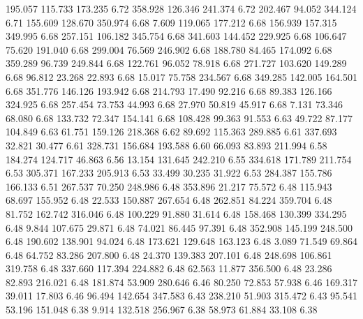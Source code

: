 195.057  115.733  173.235         6.72
 358.928  126.346  241.374         6.72
 202.467   94.052  344.124         6.71
 155.609  128.670  350.974         6.68
   7.609  119.065  177.212         6.68
 156.939  157.315  349.995         6.68
 257.151  106.182  345.754         6.68
 341.603  144.452  229.925         6.68
 106.647   75.620  191.040         6.68
 299.004   76.569  246.902         6.68
 188.780   84.465  174.092         6.68
 359.289   96.739  249.844         6.68
 122.761   96.052   78.918         6.68
 271.727  103.620  149.289         6.68
  96.812   23.268   22.893         6.68
  15.017   75.758  234.567         6.68
 349.285  142.005  164.501         6.68
 351.776  146.126  193.942         6.68
 214.793   17.490   92.216         6.68
  89.383  126.166  324.925         6.68
 257.454   73.753   44.993         6.68
  27.970   50.819   45.917         6.68
   7.131   73.346   68.080         6.68
 133.732   72.347  154.141         6.68
 108.428   99.363   91.553         6.63
  49.722   87.177  104.849         6.63
  61.751  159.126  218.368         6.62
  89.692  115.363  289.885         6.61
 337.693   32.821   30.477         6.61
 328.731  156.684  193.588         6.60
  66.093   83.893  211.994         6.58
 184.274  124.717   46.863         6.56
  13.154  131.645  242.210         6.55
 334.618  171.789  211.754         6.53
 305.371  167.233  205.913         6.53
  33.499   30.235   31.922         6.53
 284.387  155.786  166.133         6.51
 267.537   70.250  248.986         6.48
 353.896   21.217   75.572         6.48
 115.943   68.697  155.952         6.48
  22.533  150.887  267.654         6.48
 262.851   84.224  359.704         6.48
  81.752  162.742  316.046         6.48
 100.229   91.880   31.614         6.48
 158.468  130.399  334.295         6.48
   9.844  107.675   29.871         6.48
  74.021   86.445   97.391         6.48
 352.908  145.199  248.500         6.48
 190.602  138.901   94.024         6.48
 173.621  129.648  163.123         6.48
   3.089   71.549   69.864         6.48
  64.752   83.286  207.800         6.48
  24.370  139.383  207.101         6.48
 248.698  106.861  319.758         6.48
 337.660  117.394  224.882         6.48
  62.563   11.877  356.500         6.48
  23.286   82.893  216.021         6.48
 181.874   53.909  280.646         6.46
  80.250   72.853   57.938         6.46
 169.317   39.011   17.803         6.46
  96.494  142.654  347.583         6.43
 238.210   51.903  315.472         6.43
  95.541   53.196  151.048         6.38
   9.914  132.518  256.967         6.38
  58.973   61.884   33.108         6.38

